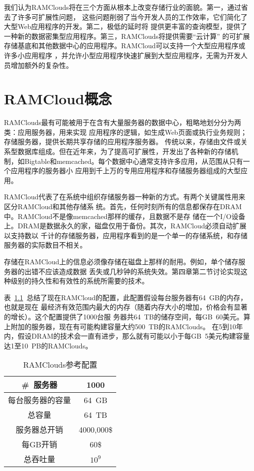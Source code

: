 \documentclass[translation]{zjutreport}
\begin{document}
我们认为RAMClouds将在三个方面从根本上改变存储行业的面貌。第一，通过省去了许多可扩展性问题，
这些问题削弱了当今开发人员的工作效率，它们简化了大型Web应用程序的开发。第二，极低的延时将
提供更丰富的查询模型，提供了一种新的数据密集型应用程序。第三，RAMClouds将提供需要“云计算”
的可扩展存储基底和其他数据中心的应用程序。RAMCloud可以支持一个大型应用程序或许多小应用程序
，并允许小型应用程序快速扩展到大型应用程序，无需为开发人员增加额外的复杂性。


\chapter{RAMCloud概念}
RAMClouds最有可能被用于在含有大量服务器的数据中心，粗略地划分分为两类：应用服务器，用来实现
应用程序的逻辑，如生成Web页面或执行业务规则；存储服务器，提供长期共享存储的应用程序服务器。
传统以来，存储由文件或关系型数据库组成。但在近年来，为了提高可扩展性，开发出了各种新的存储机
制，如Bigtable和memcached。每个数据中心通常支持许多应用，从范围从只有一个应用程序的服务器小
应用到千上万的专用应用程序和存储服务器组成的大型应用。

RAMCloud代表了在系统中组织存储服务器一种新的方式。有两个关键属性用来区分RAMCloud和其他存储系
统。首先，任何时刻所有的信息都保存在DRAM中。RAMCloud不是像memcached那样的缓存，且数据不是存
储在一个I/O设备上。DRAM是数据永久的家，磁盘仅用于备份。其次，RAMCloud必须自动扩展以支持数以
千计的存储服务器，应用程序看到的是一个单一的存储系统，和存储服务器的实际数目不相关。

存储在RAMCloud上的信息必须像存储在磁盘上那样的耐用。例如，单个储存服务器的出错不应该造成数据
丢失或几秒钟的系统失效。第四章第二节讨论实现这种级别的持久性和有效性的系统所需要的技术。

表~\ref{tab:table1}~总结了现在RAMCloud的配置，此配置假设每台服务器有64~GB的内存，也就是现在
最经济有效范围内最大的内存（随着内存大小的增加，价格会有显著的增长）。这个配置提供了1000台服
务器共64~TB的储存空间，每GB~60美元。算上附加的服务器，现在有可能构建容量大约500~TB的RAMClouds。
在5到10年内，假设DRAM的技术会一直有进步，那么就有可能以小于每GB~5美元构建容量达1至10~PB的RAMClouds。

\begin{table}[htbp]
\caption{RAMClouds参考配置}\label{tab:table1}
\vspace{0.5em}
\begin{center}
{\wuhao
\begin{tabular}{cc}
\toprule[1.5pt]
\#~服务器 & 1000\\
\midrule[1pt]
每台服务器的容量 & 64~GB \\
总容量 & 64~TB \\
服务器总开销 & 4000,000\$ \\
每GB开销 & 60\$ \\
总吞吐量 & $10^{9}$ \\
\bottomrule[1.5pt]
\end{tabular}}
\end{center}
\vspace{\baselineskip}
\end{table}
\end{document}

